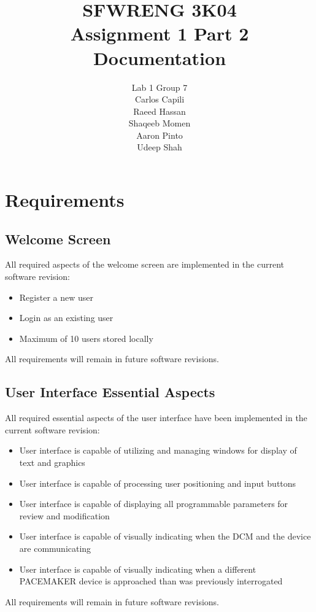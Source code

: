 \documentclass[12pt]{article}
\title{SFWRENG 3K04 \\ Assignment 1 Part 2 \\ Documentation}
\author{
    Lab 1 Group 7 \\
    Carlos Capili \\
    Raeed Hassan \\
    Shaqeeb Momen \\
    Aaron Pinto \\
    Udeep Shah
}
\date{}
\begin{document}
\maketitle \newpage
\tableofcontents \newpage

\section{Requirements}

\subsection{Welcome Screen}
All required aspects of the welcome screen are implemented in the current software revision: 
\begin{itemize}
    \item Register a new user
    \item Login as an existing user
    \item Maximum of 10 users stored locally
\end{itemize}
All requirements will remain in future software revisions.  

\subsection{User Interface Essential Aspects}
All required essential aspects of the user interface have been implemented in the current software revision:
\begin{itemize}
    \item User interface is capable of utilizing and managing windows for display of text and graphics
    \item User interface is capable of processing user positioning and input buttons
    \item User interface is capable of displaying all programmable parameters for review and modification
    \item User interface is capable of visually indicating when the DCM and the device are communicating
    \item User interface is capable of visually indicating when a different PACEMAKER device is approached than was previously interrogated
\end{itemize}
All requirements will remain in future software revisions.
\end{document}
